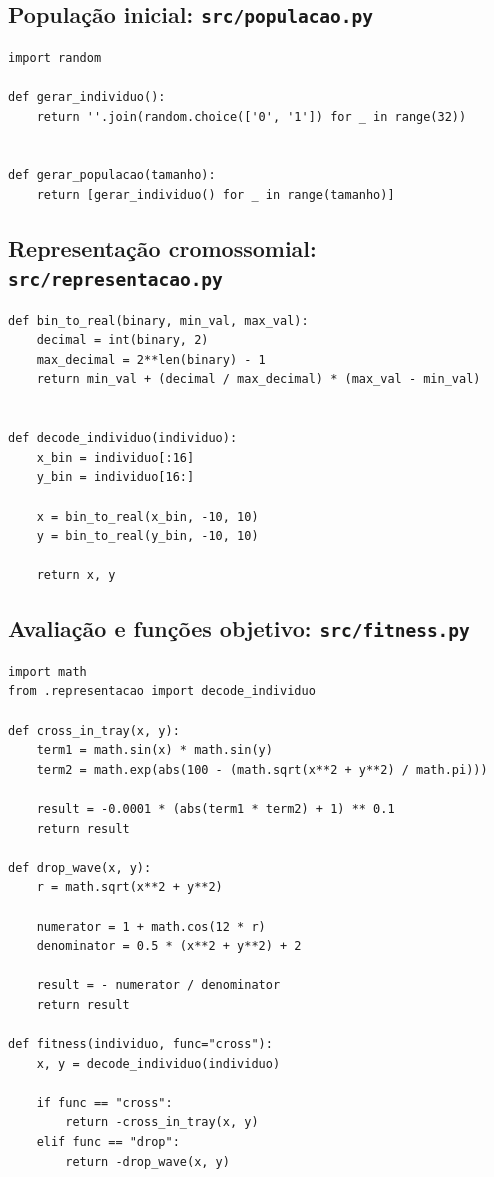 \documentclass[a4paper,12pt]{article}
\begin{document}
\subsection{População inicial: \texttt{src/populacao.py}}

\begin{lstlisting}[caption={src/populacao.py}]
import random

def gerar_individuo():
    return ''.join(random.choice(['0', '1']) for _ in range(32))


def gerar_populacao(tamanho):
    return [gerar_individuo() for _ in range(tamanho)]
\end{lstlisting}

\subsection{Representação cromossomial: \texttt{src/representacao.py}}

\begin{lstlisting}[caption={src/representacao.py}]
def bin_to_real(binary, min_val, max_val):
    decimal = int(binary, 2)
    max_decimal = 2**len(binary) - 1
    return min_val + (decimal / max_decimal) * (max_val - min_val)


def decode_individuo(individuo):
    x_bin = individuo[:16]
    y_bin = individuo[16:]

    x = bin_to_real(x_bin, -10, 10)
    y = bin_to_real(y_bin, -10, 10)

    return x, y
\end{lstlisting}

\subsection{Avaliação e funções objetivo: \texttt{src/fitness.py}}

\begin{lstlisting}[caption={src/fitness.py}]
import math
from .representacao import decode_individuo

def cross_in_tray(x, y):
    term1 = math.sin(x) * math.sin(y)
    term2 = math.exp(abs(100 - (math.sqrt(x**2 + y**2) / math.pi)))
    
    result = -0.0001 * (abs(term1 * term2) + 1) ** 0.1
    return result

def drop_wave(x, y):
    r = math.sqrt(x**2 + y**2)
    
    numerator = 1 + math.cos(12 * r)
    denominator = 0.5 * (x**2 + y**2) + 2
    
    result = - numerator / denominator
    return result

def fitness(individuo, func="cross"):
    x, y = decode_individuo(individuo)

    if func == "cross":
        return -cross_in_tray(x, y)
    elif func == "drop":
        return -drop_wave(x, y)
\end{lstlisting}
\end{document}
